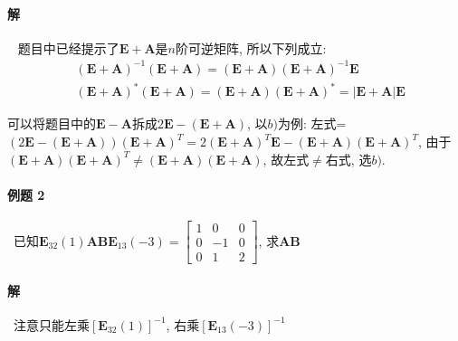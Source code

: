 \paragraph{解}~{} \noindent 题目中已经提示了$ \bm{E}+\bm{A} $是$ n $阶可逆矩阵, 所以下列成立:
\begin{equation*}
\begin{aligned}
& (\bm{E}+\bm{A})^{-1}(\bm{E}+\bm{A})=(\bm{E}+\bm{A})(\bm{E}+\bm{A})^{-1}\bm{E} \\
& (\bm{E}+\bm{A})^{*}(\bm{E}+\bm{A})=(\bm{E}+\bm{A})(\bm{E}+\bm{A})^{*}=|\bm{E}+\bm{A}|\bm{E}
\end{aligned}
\end{equation*}\par
可以将题目中的$ \bm{E}-\bm{A} $拆成$ 2\bm{E}-(\bm{E}+\bm{A}) $, 以$ b) $为例: 左式=$ (2 \bm{E}-(\bm{E}+\bm{A}))(\bm{E}+\bm{A})^{T}=2(\bm{E}+\bm{A})^{T}\bm{E}-(\bm{E}+\bm{A})(\bm{E}+\bm{A})^{T}$, 由于$ (\bm{E}+\bm{A})(\bm{E}+\bm{A})^{T}\neq (\bm{E}+\bm{A})(\bm{E}+\bm{A}) $, 故左式$ \neq $右式, 选$ b) $.
\paragraph{例题 2}~{已知$ \bm{E}_{32}(1)\bm{A}\bm{B}\bm{E}_{13}(-3)=
\begin{bmatrix}
1 & 0 & 0 \\
0 & -1 & 0 \\
0 & 1 & 2
\end{bmatrix}$, 求$ \bm{A}\bm{B} $}
\paragraph{解}~{注意只能左乘$ [\bm{E}_{32}(1)]^{-1} $, 右乘$ [\bm{E}_{13}(-3)]^{-1} $}
